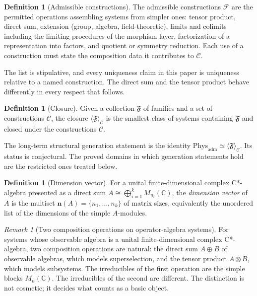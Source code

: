 \documentclass[11pt,letterpaper]{article}
\theoremstyle{definition}
\newtheorem{definition}[theorem]{Definition}
\theoremstyle{remark}
\newtheorem{remark}[theorem]{Remark}
\begin{document}
\begin{definition}[Admissible constructions]
The admissible constructions $\mathcal{F}$ are the permitted operations assembling systems from simpler ones: tensor product, direct sum, extension (group, algebra, field-theoretic), limits and colimits including the limiting procedures of the morphism layer, factorization of a representation into factors, and quotient or symmetry reduction. Each use of a construction must state the composition data it contributes to $\mathcal{C}$.
\end{definition}

The list is stipulative, and every uniqueness claim in this paper is uniqueness relative to a named construction. The direct sum and the tensor product behave differently in every respect that follows.

\begin{definition}[Closure]
Given a collection $\mathfrak{F}$ of families and a set of constructions $\mathcal{C}$, the closure $\langle \mathfrak{F} \rangle_{\mathcal{C}}$ is the smallest class of systems containing $\mathfrak{F}$ and closed under the constructions $\mathcal{C}$.
\end{definition}

The long-term structural generation statement is the identity $\mathrm{Phys}_{\mathrm{adm}} \simeq \langle \mathfrak{F} \rangle_{\mathcal{C}}$. Its status is conjectural. The proved domains in which generation statements hold are the restricted ones treated below.

\begin{definition}[Dimension vector]
For a unital finite-dimensional complex C*-algebra presented as a direct sum $A \cong \bigoplus_{i=1}^{k} M_{n_i}(\mathbb{C})$, the \emph{dimension vector} of $A$ is the multiset $\mathbf{n}(A) = \{n_1, \dots, n_k\}$ of matrix sizes, equivalently the unordered list of the dimensions of the simple $A$-modules.
\end{definition}

\begin{remark}[Two composition operations on operator-algebra systems]
For systems whose observable algebra is a unital finite-dimensional complex C*-algebra, two composition operations are natural: the direct sum $A \oplus B$ of observable algebras, which models superselection, and the tensor product $A \otimes B$, which models subsystems. The irreducibles of the first operation are the simple blocks $M_n(\mathbb{C})$. The irreducibles of the second are different. The distinction is not cosmetic; it decides what counts as a basic object.
\end{remark}
\end{document}
